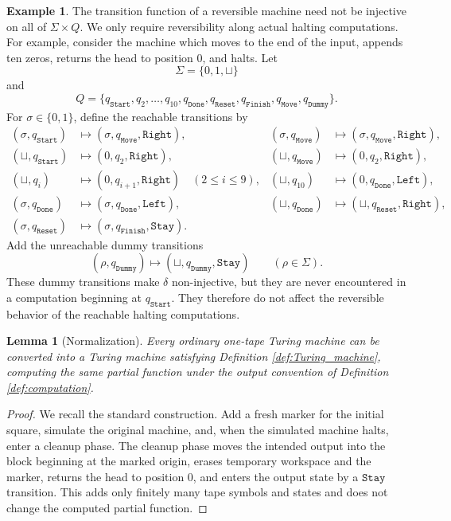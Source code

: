 \documentclass[12pt]{article}
\theoremstyle{plain}
\newtheorem{lemma}[thm]{Lemma}
\theoremstyle{definition}
\newtheorem{exmp}[thm]{Example}
\newcommand{\blank}{\sqcup}
\newcommand{\Start}{q_{\texttt{Start}}}
\newcommand{\Finish}{q_{\texttt{Finish}}}
\begin{document}
\begin{exmp}\label{ex:noninjective}
The transition function of a reversible machine need not be injective on all of $\Sigma\times Q$. We only require reversibility along actual halting computations. For example, consider the machine which moves to the end of the input, appends ten zeros, returns the head to position $0$, and halts. Let
\[
\Sigma=\{0,1,\blank\}
\]
and
\[
Q=\{\Start,q_2,\ldots,q_{10},q_{\texttt{Done}},q_{\texttt{Reset}},\Finish,q_{\texttt{Move}},q_{\texttt{Dummy}}\}.
\]
For $\sigma\in\{0,1\}$, define the reachable transitions by
\begin{align*}
(\sigma,\Start)&\longmapsto(\sigma,q_{\texttt{Move}},\texttt{Right}),
&
(\sigma,q_{\texttt{Move}})&\longmapsto(\sigma,q_{\texttt{Move}},\texttt{Right}),\\
(\blank,\Start)&\longmapsto(0,q_2,\texttt{Right}),
&
(\blank,q_{\texttt{Move}})&\longmapsto(0,q_2,\texttt{Right}),\\
(\blank,q_i)&\longmapsto(0,q_{i+1},\texttt{Right})\quad(2\leq i\leq 9),
&
(\blank,q_{10})&\longmapsto(0,q_{\texttt{Done}},\texttt{Left}),\\
(\sigma,q_{\texttt{Done}})&\longmapsto(\sigma,q_{\texttt{Done}},\texttt{Left}),
&
(\blank,q_{\texttt{Done}})&\longmapsto(\blank,q_{\texttt{Reset}},\texttt{Right}),\\
(\sigma,q_{\texttt{Reset}})&\longmapsto(\sigma,\Finish,\texttt{Stay}).
\end{align*}
Add the unreachable dummy transitions
\[
(\rho,q_{\texttt{Dummy}})\longmapsto(\blank,q_{\texttt{Dummy}},\texttt{Stay})
\qquad(\rho\in\Sigma).
\]
These dummy transitions make $\delta$ non-injective, but they are never encountered in a computation beginning at $\Start$. They therefore do not affect the reversible behavior of the reachable halting computations.
\end{exmp}

\begin{lemma}[Normalization]\label{lem:normalization}
Every ordinary one-tape Turing machine can be converted into a Turing machine satisfying Definition \ref{def:Turing_machine}, computing the same partial function under the output convention of Definition \ref{def:computation}.
\end{lemma}

\begin{proof}
We recall the standard construction. Add a fresh marker for the initial square, simulate the original machine, and, when the simulated machine halts, enter a cleanup phase. The cleanup phase moves the intended output into the block beginning at the marked origin, erases temporary workspace and the marker, returns the head to position $0$, and enters the output state by a $\texttt{Stay}$ transition. This adds only finitely many tape symbols and states and does not change the computed partial function.
\end{proof}
\end{document}
